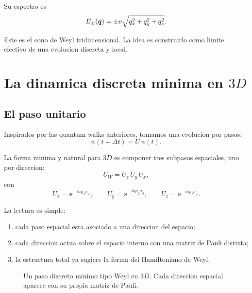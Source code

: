 Su espectro es
\begin{equation}
E_\pm(\bm{q})=\pm v\sqrt{q_x^2+q_y^2+q_z^2}.
\label{c07:eq:weyl-disp}
\end{equation}

Este es el cono de Weyl tridimensional. La idea es construirlo como limite efectivo de una evolucion discreta y local.

\section{La dinamica discreta minima en \(3D\)}

\subsection{El paso unitario}

Inspirados por las quantum walks anteriores, tomamos una evolucion por pasos:
\begin{equation}
\psi(t+\Delta t)=U\,\psi(t).
\end{equation}

La forma minima y natural para \(3D\) es componer tres subpasos espaciales, uno por direccion:
\begin{equation}
U_W = U_z\,U_y\,U_x,
\label{c07:eq:Uw}
\end{equation}
con
\begin{equation}
U_x = \ee^{-\,\ii a p_x \sigma_x},
\qquad
U_y = \ee^{-\,\ii a p_y \sigma_y},
\qquad
U_z = \ee^{-\,\ii a p_z \sigma_z}.
\label{c07:eq:UxUyUz}
\end{equation}

La lectura es simple:

\begin{enumerate}[leftmargin=*]
  \item cada paso espacial esta asociado a una direccion del espacio;
  \item cada direccion actua sobre el espacio interno con una matriz de Pauli distinta;
  \item la estructura total ya sugiere la forma del Hamiltoniano de Weyl.
\end{enumerate}

\begin{figure}[ht]
\centering
{}
\caption{Un paso discreto minimo tipo Weyl en \(3D\). Cada direccion espacial aparece con su propia matriz de Pauli.}
\label{c07:fig:three-steps}
\end{figure}

